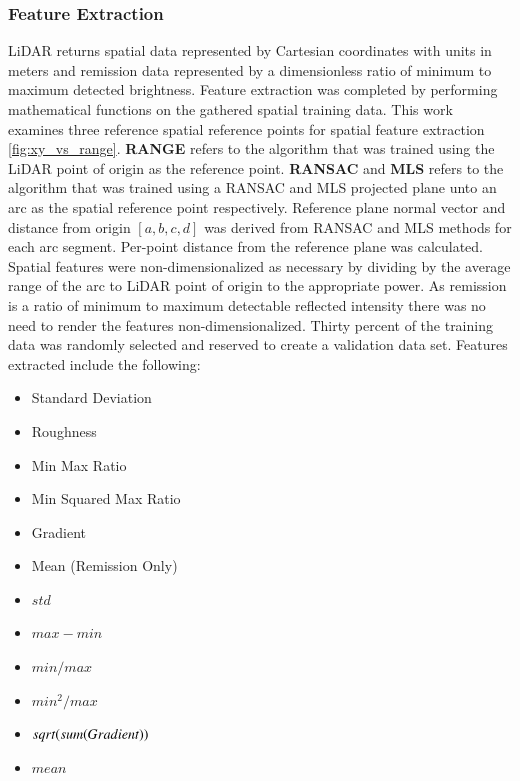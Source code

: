 \documentclass[numbered,pdftex]{ohio-etd}
\begin{document}
{{{{			} %
		
		\newpage
			
			\subsubsection{Feature Extraction}\label{sec:Feat_Extract} {
			
				{LiDAR returns spatial data represented by Cartesian coordinates with units in meters and remission data represented by a dimensionless ratio of minimum to maximum detected brightness. Feature extraction was completed by performing mathematical functions on the gathered spatial training data. This work examines three reference spatial reference points for spatial feature extraction \ref{fig:xy_vs_range}. \textbf{RANGE} refers to the algorithm that was trained using the LiDAR point of origin as the reference point. \textbf{RANSAC} and \textbf{MLS} refers to the algorithm that was trained using a RANSAC and MLS projected plane unto an arc as the spatial reference point respectively. Reference plane normal vector and distance from origin $[a,b,c,d]$ was derived from RANSAC and MLS methods for each arc segment. Per-point distance from the reference plane was calculated. Spatial features were non-dimensionalized as necessary by dividing by the average range of the arc to LiDAR point of origin to the appropriate power. As remission is a ratio of minimum to maximum detectable reflected intensity there was no need to render the features non-dimensionalized. Thirty percent of the training data was randomly selected and reserved to create a validation data set. Features extracted include the following:}
				
				\begin{multicols}{2}
					\begin{itemize}[itemsep=.1pt]
						\item Standard Deviation
						\item Roughness
						\item Min Max Ratio
						\item Min Squared Max Ratio
						\item Gradient
						\item Mean (Remission Only)
					\end{itemize}
					\vfill\null
					\columnbreak
					\begin{itemize}[itemsep=.1pt]
						\item $std$
						\item $max - min$
						\item $min / max$
						\item $min^2 / max$
						\item $sqrt(sum(Gradient\*))$
						\item $mean$
					\end{itemize}
					\vfill\null
					\label{lst:feature_list}
				\end{multicols}
				
}}}}
\end{document}

